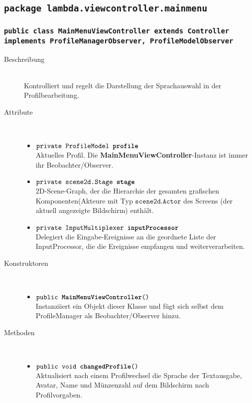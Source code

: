 \subsection{\texttt{package lambda.viewcontroller.mainmenu}}

\subsubsection{\normalfont \texttt{public class \textbf{MainMenuViewController} extends Controller implements ProfileManagerObserver, ProfileModelObserver}}

\begin{description}
\item[Beschreibung] \hfill \\ Kontrolliert und regelt die Darstellung der Sprachauswahl in der Profilbearbeitung.
\item[Attribute] \hfill \\
	\vspace{-.8cm}
	\begin{itemize}
		\item $\texttt{private ProfileModel \textbf{profile}}$ \\ Aktuelles Profil. Die \textbf{MainMenuViewController}-Instanz ist immer ihr Beobachter/Observer.
		\item $\texttt{private scene2d.Stage \textbf{stage}}$ \\ 2D-Scene-Graph, der die Hierarchie der gesamten grafischen Komponenten(Akteure mit Typ $\texttt{scene2d.Actor}$ des Screens (der aktuell angezeigte Bildschirm) enthält. 
		\item $\texttt{private InputMultiplexer \textbf{inputProcessor}}$ \\ Delegiert die Eingabe-Ereignisse an die geordnete Liste der InputProcessor, die die Ereignisse empfangen und weiterverarbeiten.
	\end{itemize}
	
\item[Konstruktoren] \hfill \\
	\vspace{-.8cm}
	\begin{itemize}
		\item $\texttt{public \textbf{MainMenuViewController}()}$ \\ Instanziiert ein Objekt dieser Klasse und fügt sich selbst dem ProfileManager als Beobachter/Observer hinzu.
	\end{itemize}
	
\item[Methoden] \hfill \\
	\vspace{-.8cm}
	\begin{itemize}		
		\item $\texttt{public void \textbf{changedProfile}()}$ \\ Aktualisiert nach einem Profilwechsel die Sprache der Textausgabe, Avatar, Name und Münzenzahl auf dem Bildschirm nach Profilvorgaben.
		

\end{itemize}
\end{description}
